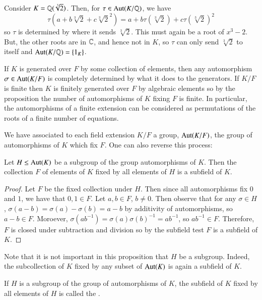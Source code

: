 \documentclass[12pt, a4paper, oneside, openright, titlepage]{book}
\begin{document}
\begin{eg}
    Consider $K = \mathbb Q(\sqrt[3]{2})$. Then, for $\tau \in \operatorname{Aut}(K/\mathbb Q)$, we have \begin{equation*}
        \tau(a+b\sqrt[3]{2}+c\sqrt[3]{2}^2) = a+b\tau(\sqrt[3]{2})+c\tau(\sqrt[3]{2})^2
    \end{equation*}
    so $\tau$ is determined by where it sends $\sqrt[3]{2}$. This must again be a root of $x^3 - 2$. But, the other roots are in $\mathbb C$, and hence not in $K$, so $\tau$ can only send $\sqrt[3]{2}$ to itself and $\operatorname{Aut}(K/\mathbb Q) = \{1_K\}$.
\end{eg}

If $K$ is generated over $F$ by some collection of elements, then any automorphism $\sigma \in \operatorname{Aut}(K/F)$ is completely determined by what it does to the generators. If $K/F$ is finite then $K$ is finitely generated over $F$ by algebraic elements so by the proposition the number of automorphisms of $K$ fixing $F$ is finite. In particular, the automorphisms of a finite extension can be considered as permutations of the roots of a finite number of equations. 


We have associated to each field extension $K/F$ a group, $\operatorname{Aut}(K/F)$, the group of automorphisms of $K$ which fix $F$. One can also reverse this process: 

\begin{prop}
    Let $H \leq \operatorname{Aut}(K)$ be a subgroup of the group automorphisms of $K$. Then the collection $F$ of elements of $K$ fixed by all elements of $H$ is a subfield of $K$.
\end{prop}
\begin{proof}
    Let $F$ be the fixed collection under $H$. Then since all automorphisms fix $0$ and $1$, we have that $0,1 \in F$. Let $a,b \in F$, $b \neq 0$. Then observe that for any $\sigma \in H$, $\sigma(a-b) = \sigma(a)-\sigma(b) = a-b$ by additivity of automorphisms, so $a-b \in F$. Moroever, $\sigma(ab^{-1}) = \sigma(a)\sigma(b)^{-1} = ab^{-1}$, so $ab^{-1} \in F$. Therefore, $F$ is closed under subtraction and division so by the subfield test $F$ is a subfield of $K$.
\end{proof}

Note that it is not important in this proposition that $H$ be a subgroup. Indeed, the subcollection of $K$ fixed by any subset of $\operatorname{Aut}(K)$ is again a subfield of $K$.

\begin{defn}
    If $H$ is a subgroup of the group of automorphisms of $K$, the subfield of $K$ fixed by all elements of $H$ is called the .
\end{defn}
\end{document}
